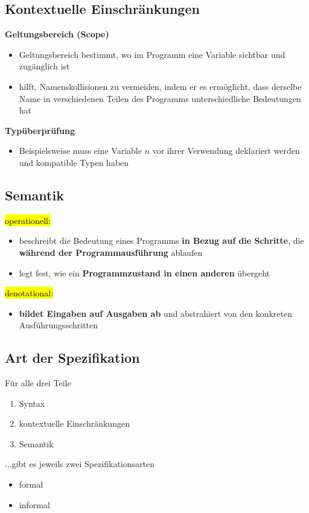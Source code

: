 \documentclass[a4paper, 10pt]{article}
\begin{document}
 \subsection{Kontextuelle Einschränkungen}
 \begin{definitionbox}
 \textbf{Geltungsbereich (Scope)}
 \begin{itemize}
     \item Geltungsbereich bestimmt, wo im Programm eine Variable sichtbar und zugänglich ist
     \item hilft, Namenskollisionen zu vermeiden, indem er es ermöglicht, dass derselbe Name in verschiedenen Teilen des Programms unterschiedliche Bedeutungen hat
 \end{itemize}
 \end{definitionbox}

 \noindent\begin{definitionbox}
     \textbf{Typüberprüfung}
     \begin{itemize}
         \item Beispielsweise muss eine Variable $n$ vor ihrer Verwendung deklariert werden und kompatible Typen haben
     \end{itemize}
 \end{definitionbox}
 \subsection{Semantik}
 \hl{operationell:}
 \begin{itemize}
     \item  beschreibt die Bedeutung eines Programms \textbf{in Bezug auf die Schritte}, die \textbf{während der Programmausführung} ablaufen
     \item legt fest, wie ein \textbf{Programmzustand in einen anderen} übergeht
 \end{itemize}

 \noindent\hl{denotational:}
 \begin{itemize}
     \item \textbf{bildet Eingaben auf Ausgaben ab} und abstrahiert von den konkreten Ausführungsschritten
 \end{itemize}

 \subsection{Art der Spezifikation}
 Für alle drei Teile 
 \begin{enumerate}
     \item Syntax
     \item kontextuelle Einschränkungen
     \item Semantik
 \end{enumerate}
 ...gibt es jeweils zwei Spezifikationsarten
 \begin{itemize}
     \item formal
     \item informal
 \end{itemize}
\end{document}

